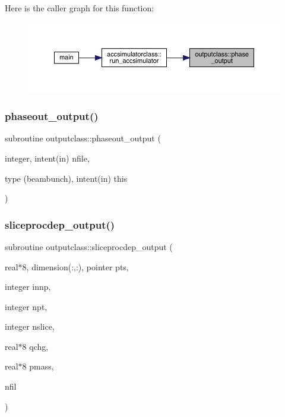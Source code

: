 Here is the caller graph for this function\+:\nopagebreak
\begin{figure}[H]
\begin{center}
\leavevmode
\includegraphics[width=350pt]{namespaceoutputclass_a86742b646a584647da7837ee6fc09c89_icgraph}
\end{center}
\end{figure}
\mbox{\label{namespaceoutputclass_a92eb6a8aec3f143754010f6e417e8ac2}} 
\subsubsection{\texorpdfstring{phaseout\_output()}{phaseout\_output()}}
{\footnotesize\ttfamily subroutine outputclass\+::phaseout\+\_\+output (\begin{DoxyParamCaption}\item[{integer, intent(in)}]{nfile,  }\item[{type (beambunch), intent(in)}]{this }\end{DoxyParamCaption})}

\mbox{\label{namespaceoutputclass_aaba51e45761070d95883093a25e402c4}} 
\subsubsection{\texorpdfstring{sliceprocdep\_output()}{sliceprocdep\_output()}}
{\footnotesize\ttfamily subroutine outputclass\+::sliceprocdep\+\_\+output (\begin{DoxyParamCaption}\item[{real$\ast$8, dimension(\+:,\+:), pointer}]{pts,  }\item[{integer}]{innp,  }\item[{integer}]{npt,  }\item[{integer}]{nslice,  }\item[{real$\ast$8}]{qchg,  }\item[{real$\ast$8}]{pmass,  }\item[{}]{nfil }\end{DoxyParamCaption})}



